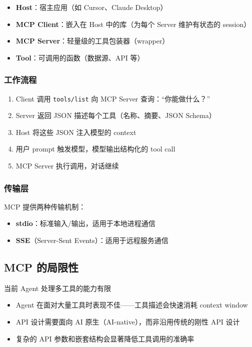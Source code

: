 \documentclass[a4paper]{article}
\begin{document}
\begin{itemize}
    \item \textbf{Host}：宿主应用（如 Cursor、Claude Desktop）
    \item \textbf{MCP Client}：嵌入在 Host 中的库（为每个 Server 维护有状态的 session）
    \item \textbf{MCP Server}：轻量级的工具包装器（wrapper）
    \item \textbf{Tool}：可调用的函数（数据源、API 等）
\end{itemize}

\subsubsection{工作流程}

\begin{enumerate}
    \item Client 调用 \texttt{tools/list} 向 MCP Server 查询：``你能做什么？''
    \item Server 返回 JSON 描述每个工具（名称、摘要、JSON Schema）
    \item Host 将这些 JSON 注入模型的 context
    \item 用户 prompt 触发模型，模型输出结构化的 tool call
    \item MCP Server 执行调用，对话继续
\end{enumerate}

\subsubsection{传输层}

MCP 提供两种传输机制：
\begin{itemize}
    \item \textbf{stdio}：标准输入/输出，适用于本地进程通信
    \item \textbf{SSE}（Server-Sent Events）：适用于远程服务通信
\end{itemize}

\subsection{MCP 的局限性}

\begin{warningbox}{当前 Agent 处理多工具的能力有限}
\begin{itemize}
    \item Agent 在面对大量工具时表现不佳——工具描述会快速消耗 context window
    \item API 设计需要面向 AI 原生（AI-native），而非沿用传统的刚性 API 设计
    \item 复杂的 API 参数和嵌套结构会显著降低工具调用的准确率
\end{itemize}
\end{warningbox}
\end{document}
